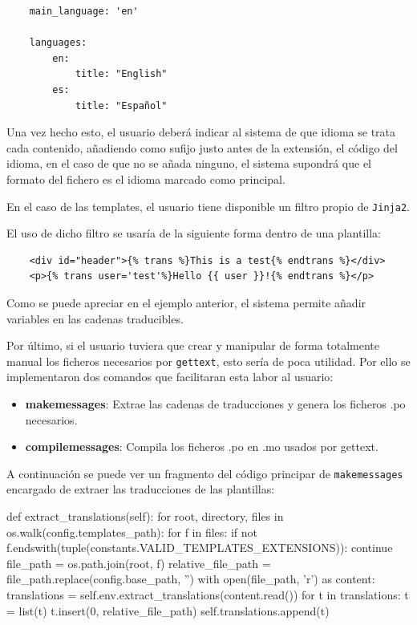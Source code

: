 \begin{verbatim}
    main_language: 'en'

    languages:
        en:
            title: "English"
        es:
            title: "Español"
\end{verbatim}

Una vez hecho esto, el usuario deberá indicar al sistema de que idioma se trata cada contenido, añadiendo como sufijo
justo antes de la extensión, el código del idioma, en el caso de que no se añada ninguno, el sistema supondrá que
el formato del fichero es el idioma marcado como principal.

En el caso de las templates, el usuario tiene disponible un filtro propio de \texttt{Jinja2}.

El uso de dicho filtro se usaría de la siguiente forma dentro de una plantilla:
\begin{verbatim}
    <div id="header">{% trans %}This is a test{% endtrans %}</div>
    <p>{% trans user='test'%}Hello {{ user }}!{% endtrans %}</p>
\end{verbatim}

Como se puede apreciar en el ejemplo anterior, el sistema permite añadir variables en las cadenas 
traducibles.

Por último, si el usuario tuviera que crear y manipular de forma totalmente manual los ficheros
necesarios por \texttt{gettext}, esto sería de poca utilidad. Por ello se implementaron dos comandos
que facilitaran esta labor al usuario:

\begin{itemize}
	\item \textbf{makemessages}: Extrae las cadenas de traducciones y genera los ficheros .po necesarios.
	\item \textbf{compilemessages}: Compila los ficheros .po en .mo usados por gettext.
\end{itemize}

A continuación se puede ver un fragmento del código principar de \texttt{makemessages}
encargado de extraer las traducciones de las plantillas:

\begin{pythoncode}
def extract_translations(self):
    for root, directory, files in os.walk(config.templates_path):
        for f in files:
            if not f.endswith(tuple(constants.VALID_TEMPLATES_EXTENSIONS)):
                continue
            file_path = os.path.join(root, f)
            relative_file_path = file_path.replace(config.base_path, '')
            with open(file_path, 'r') as content:
                translations = self.env.extract_translations(content.read())
                for t in translations:
                    t = list(t)
                    t.insert(0, relative_file_path)
                    self.translations.append(t)
\end{pythoncode}
